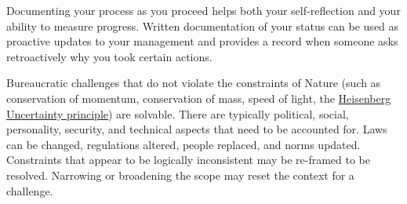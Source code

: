 Documenting your process as you proceed helps both your self-reflection and your ability to measure progress. Written documentation of your status can be used as proactive updates to your management and provides a record when someone asks retroactively why you took certain actions.

Bureaucratic challenges that do not violate the constraints of Nature (such as conservation of momentum, conservation of mass, speed of light, the \href{https://en.wikipedia.org/wiki/Uncertainty_principle}{Heisenberg Uncertainty principle}) are solvable. There are typically political, social, personality, security, and technical aspects that need to be accounted for. Laws can be changed, regulations altered, people replaced, and norms updated. Constraints that appear to be logically inconsistent may be re-framed to be resolved. Narrowing or broadening the scope may reset the context for a challenge.



